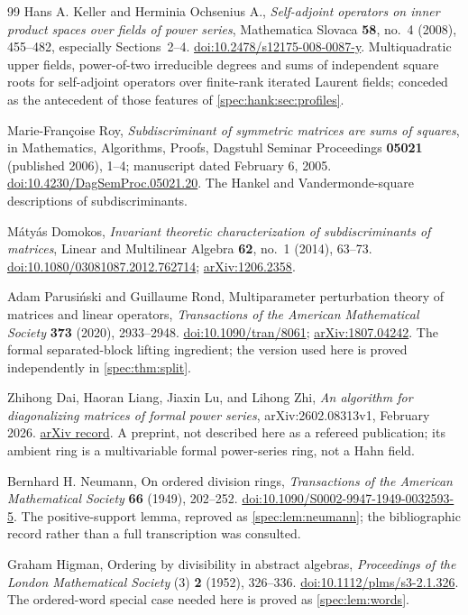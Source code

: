 \documentclass[11pt,a4paper]{article}
\numberwithin{equation}{section}
\theoremstyle{definition}
\theoremstyle{remark}
\begin{document}
\begin{thebibliography}{99}
Hans A. Keller and Herminia Ochsenius A., \emph{Self-adjoint operators on
inner product spaces over fields of power series}, Mathematica Slovaca
\textbf{58}, no.~4 (2008), 455--482, especially Sections~2--4.
\href{https://doi.org/10.2478/s12175-008-0087-y}{doi:10.2478/s12175-008-0087-y}.
Multiquadratic upper fields, power-of-two irreducible degrees and sums of
independent square roots for self-adjoint operators over finite-rank
iterated Laurent fields; conceded as the antecedent of those features of
\cref{spec:hank:sec:profiles}.

Marie-Fran\c{c}oise Roy, \emph{Subdiscriminant of symmetric matrices are sums
of squares}, in Mathematics, Algorithms, Proofs, Dagstuhl Seminar Proceedings
\textbf{05021} (published 2006), 1--4; manuscript dated February 6, 2005.
\href{https://doi.org/10.4230/DagSemProc.05021.20}{doi:10.4230/DagSemProc.05021.20}.
The Hankel and Vandermonde-square descriptions of subdiscriminants.

M\'aty\'as Domokos, \emph{Invariant theoretic characterization of
subdiscriminants of matrices}, Linear and Multilinear Algebra \textbf{62},
no.~1 (2014), 63--73.
\href{https://doi.org/10.1080/03081087.2012.762714}{doi:10.1080/03081087.2012.762714};
\href{https://arxiv.org/abs/1206.2358}{arXiv:1206.2358}.

Adam Parusi\'nski and Guillaume Rond, Multiparameter perturbation theory of
matrices and linear operators, \emph{Transactions of the American
Mathematical Society} \textbf{373} (2020), 2933--2948.
\href{https://doi.org/10.1090/tran/8061}{doi:10.1090/tran/8061};
\href{https://arxiv.org/abs/1807.04242}{arXiv:1807.04242}.
The formal separated-block lifting ingredient; the version used here is
proved independently in \cref{spec:thm:split}.

Zhihong Dai, Haoran Liang, Jiaxin Lu, and Lihong Zhi,
\emph{An algorithm for diagonalizing matrices of formal power series},
arXiv:2602.08313v1, February 2026.
\href{https://arxiv.org/abs/2602.08313}{arXiv record}.
A preprint, not described here as a refereed publication; its ambient ring
is a multivariable formal power-series ring, not a Hahn field.

Bernhard H. Neumann, On ordered division rings, \emph{Transactions of the
American Mathematical Society} \textbf{66} (1949), 202--252.
\href{https://doi.org/10.1090/S0002-9947-1949-0032593-5}{doi:10.1090/S0002-9947-1949-0032593-5}.
The positive-support lemma, reproved as \cref{spec:lem:neumann}; the
bibliographic record rather than a full transcription was consulted.

Graham Higman, Ordering by divisibility in abstract algebras,
\emph{Proceedings of the London Mathematical Society} (3) \textbf{2} (1952),
326--336.
\href{https://doi.org/10.1112/plms/s3-2.1.326}{doi:10.1112/plms/s3-2.1.326}.
The ordered-word special case needed here is proved as
\cref{spec:lem:words}.

\end{thebibliography}
\end{document}
